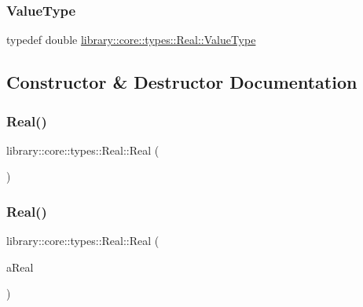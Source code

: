\subsubsection{\texorpdfstring{Value\+Type}{ValueType}}
{\footnotesize\ttfamily typedef double \hyperlink{classlibrary_1_1core_1_1types_1_1Real_a9c5c8826b7e5a8e39544d23fea6c0e1c}{library\+::core\+::types\+::\+Real\+::\+Value\+Type}}



\subsection{Constructor \& Destructor Documentation}
\mbox{\label{classlibrary_1_1core_1_1types_1_1Real_a664a212a24c7016016a27cf2320a94c1}} 
\subsubsection{\texorpdfstring{Real()}{Real()}\hspace{0.1cm}{\footnotesize\ttfamily [1/2]}}
{\footnotesize\ttfamily library\+::core\+::types\+::\+Real\+::\+Real (\begin{DoxyParamCaption}{ }\end{DoxyParamCaption})\hspace{0.3cm}{\ttfamily [delete]}}

\mbox{\label{classlibrary_1_1core_1_1types_1_1Real_ab25a7f4966c2a2b8facf905a441ad5b5}} 
\subsubsection{\texorpdfstring{Real()}{Real()}\hspace{0.1cm}{\footnotesize\ttfamily [2/2]}}
{\footnotesize\ttfamily library\+::core\+::types\+::\+Real\+::\+Real (\begin{DoxyParamCaption}\item[{\hyperlink{classlibrary_1_1core_1_1types_1_1Real_a9c5c8826b7e5a8e39544d23fea6c0e1c}{Real\+::\+Value\+Type}}]{a\+Real }\end{DoxyParamCaption})}



